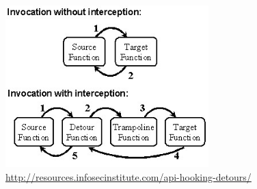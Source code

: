 \begin{figure}[h]
	\centering
	\includegraphics[width=0.7\textwidth]{sections/background/attacks/fig_detours.png}
	\caption{\url{http://resources.infosecinstitute.com/api-hooking-detours/}}
	\label{fig_detours}
\end{figure}


